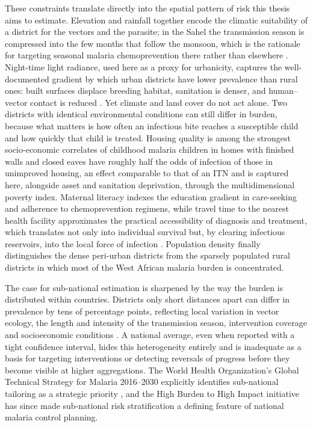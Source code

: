 \documentclass{article}
\begin{document}
These constraints translate directly into the spatial pattern of risk
this thesis aims to estimate. Elevation and rainfall together encode the
climatic suitability of a district for the vectors and the parasite; in
the Sahel the transmission season is compressed into the few months that
follow the monsoon, which is the rationale for targeting seasonal
malaria chemoprevention there rather than elsewhere
\citep{cairns2012estimating, who2012smc}. Night-time light radiance,
used here as a proxy for urbanicity, captures the well-documented
gradient by which urban districts have lower prevalence than rural ones:
built surfaces displace breeding habitat, sanitation is denser, and
human--vector contact is reduced \citep{hay2005urbanization}. Yet
climate and land cover do not act alone. Two districts with identical
environmental conditions can still differ in burden, because what
matters is how often an infectious bite reaches a susceptible child and
how quickly that child is treated. Housing quality is among the
strongest socio-economic correlates of childhood malaria children in
homes with finished walls and closed eaves have roughly half the odds of
infection of those in unimproved housing, an effect comparable to that
of an ITN \citep{tusting2017housing, tusting2019mapping} and is captured
here, alongside asset and sanitation deprivation, through the
multidimensional poverty index. Maternal literacy indexes the education
gradient in care-seeking and adherence to chemoprevention regimens,
while travel time to the nearest health facility approximates the
practical accessibility of diagnosis and treatment, which translates not
only into individual survival but, by clearing infectious reservoirs,
into the local force of infection \citep{weiss2020}. Population density
finally distinguishes the dense peri-urban districts from the sparsely
populated rural districts in which most of the West African malaria
burden is concentrated.

The case for sub-national estimation is sharpened by the way the burden
is distributed within countries. Districts only short distances apart
can differ in prevalence by tens of percentage points, reflecting local
variation in vector ecology, the length and intensity of the
transmission season, intervention coverage and socioeconomic conditions
\citep{bhatt2015, weiss2020}. A national average, even when reported
with a tight confidence interval, hides this heterogeneity entirely and
is inadequate as a basis for targeting interventions or detecting
reversals of progress before they become visible at higher aggregations.
The World Health Organization's Global Technical Strategy for Malaria
2016--2030 explicitly identifies sub-national tailoring as a strategic
priority \citep{who2023}, and the High Burden to High Impact initiative
has since made sub-national risk stratification a defining feature of
national malaria control planning.
\end{document}
